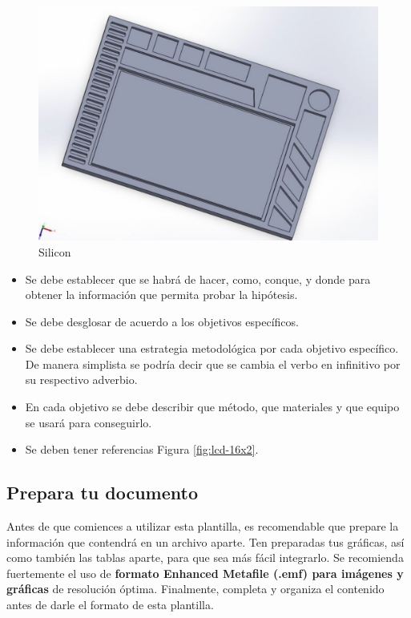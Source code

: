     \begin{figure}[H]
        \centering
        \includegraphics[trim = {1mm 1mm 1mm 1mm},clip,scale=0.2]{8/Img/Silicon.pdf}
        \caption{Silicon}
        \label{fig:enter-label}
    \end{figure}
    \begin{itemize}
        \item Se debe establecer que se habrá de hacer, como, conque, y donde para obtener la información que permita probar la hipótesis.  
        \item Se debe desglosar de acuerdo a los objetivos específicos. 
        \item Se debe establecer una estrategia metodológica por cada objetivo específico. De manera simplista se podría decir que se cambia el verbo en infinitivo por su respectivo adverbio.
        \item En cada objetivo se debe describir que método, que materiales y que equipo se usará para conseguirlo.
        \item Se deben tener referencias Figura \ref{fig:lcd-16x2}.
    \end{itemize}
    
    \subsection{Prepara tu documento}
    
    Antes de que comiences a utilizar esta plantilla, es recomendable que prepare la información que contendrá en un archivo aparte. 
    Ten preparadas tus gráficas, así como también las tablas aparte, para que sea más fácil integrarlo. 
    Se recomienda fuertemente el uso de \textbf{formato Enhanced Metafile (.emf) para imágenes y gráficas} de resolución óptima. 
    Finalmente, completa y organiza el contenido antes de darle el formato de esta plantilla. 
    
